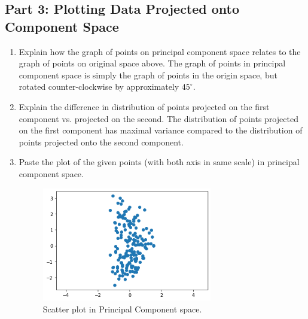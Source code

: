 \subsection{Part 3: Plotting Data Projected onto Component Space}
\begin{enumerate}
    \item Explain how the graph of points on principal component space relates to the graph of points on original space above.
    \newline
    \newline
    The graph of points in principal component space is simply the graph of points in the origin space, but rotated counter-clockwise by approximately $45^{\circ}$.
    \item Explain the difference in distribution of points projected on the first component vs. projected on the second.
    \newline
    \newline
    The distribution of points projected on the first component has maximal variance compared to the distribution of points projected onto the second component.        
    \item Paste the plot of the given points (with both axis in same scale) in principal component space.
    
\begin{figure}[H]
\centering
\includegraphics[width=0.7\textwidth]{templates/pca_simple_1}
\caption{Scatter plot in Principal Component space.}
\label{fig:my_label}
\end{figure}
\end{enumerate}
